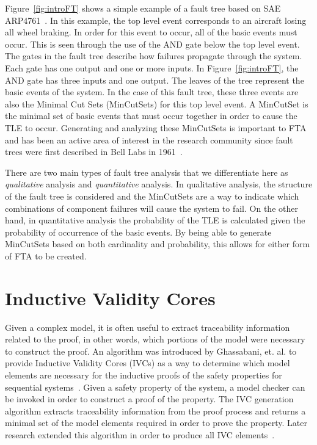 Figure~\ref{fig:introFT} shows a simple example of a fault tree based on SAE ARP4761~\cite{SAE:ARP4761}. In this example, the top level event corresponds to an aircraft losing all wheel braking. In order for this event to occur, all of the basic events must occur. This is seen through the use of the AND gate below the top level event. The gates in the fault tree describe how failures propagate through the system. Each gate has one output and one or more inputs. In Figure~\ref{fig:introFT}, the AND gate has three inputs and one output. The leaves of the tree represent the basic events of the system. %
In the case of this fault tree, these three events are also the Minimal Cut Sets (MinCutSets) for this top level event. A MinCutSet is the minimal set of basic events that must occur together in order to cause the TLE to occur. Generating and analyzing these MinCutSets is important to FTA and has been an active area of interest in the research community since fault trees were first described in Bell Labs in 1961~\cite{historyFTA,0f356f05e72f43018211b36f97c8854a}. 

There are two main types of fault tree analysis that we differentiate here as \textit{qualitative} analysis and \textit{quantitative} analysis. In qualitative analysis, the structure of the fault tree is considered and the MinCutSets are a way to indicate which combinations of component failures will cause the system to fail. On the other hand, in quantitative analysis the probability of the TLE is calculated given the probability of occurrence of the basic events. By being able to generate MinCutSets
based on both cardinality and probability, this allows for either form of FTA to be created. 


\section{Inductive Validity Cores}

Given a complex model, it is often useful to extract traceability information related to the proof, in other words, which portions of the model were necessary to construct the proof. An algorithm was introduced by Ghassabani, et. al. to provide Inductive Validity Cores (IVCs) as a way to determine which model elements are necessary for the inductive proofs of the safety properties for sequential systems~\cite{GhassabaniGW16}. Given a safety property of the system, a model checker can be invoked in order to construct a proof of the property. The IVC generation algorithm extracts traceability information from the proof process and returns a minimal set of the model elements required in order to prove the property. Later research extended this algorithm in order to produce all IVC elements~\cite{Ghassabani2017EfficientGO}. 


